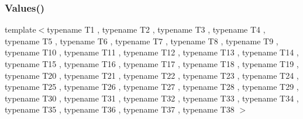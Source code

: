 \mbox{\label{namespacetesting_aabc33ee31d17eb0b0bed3401d62266d9}} 
\subsubsection{\texorpdfstring{Values()}{Values()}\hspace{0.1cm}{\footnotesize\ttfamily [38/50]}}
{\footnotesize\ttfamily template$<$typename T1 , typename T2 , typename T3 , typename T4 , typename T5 , typename T6 , typename T7 , typename T8 , typename T9 , typename T10 , typename T11 , typename T12 , typename T13 , typename T14 , typename T15 , typename T16 , typename T17 , typename T18 , typename T19 , typename T20 , typename T21 , typename T22 , typename T23 , typename T24 , typename T25 , typename T26 , typename T27 , typename T28 , typename T29 , typename T30 , typename T31 , typename T32 , typename T33 , typename T34 , typename T35 , typename T36 , typename T37 , typename T38 $>$ \\
}
